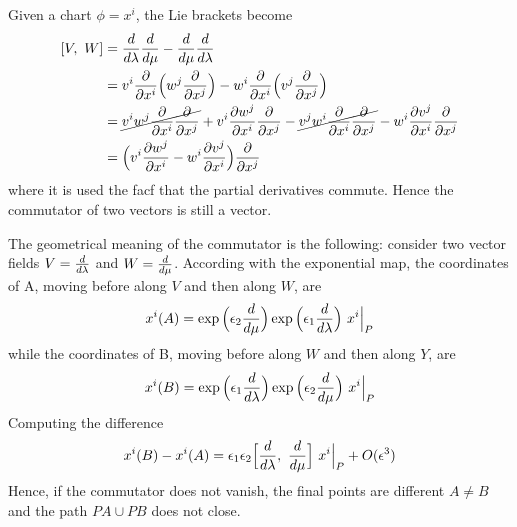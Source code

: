     Given a chart $\phi = x^i$, the Lie brackets become
    \begin{equation*}
    \begin{aligned}
        [V, ~W] & = \dv{}{\lambda} \dv{}{\mu} - \dv{}{\mu} \dv{}{\lambda} \\ & = v^i \pdv{}{x^i} \Big( w^j \pdv{}{x^j} \Big) - w^i \pdv{}{x^i} \Big( v^j \pdv{}{x^j} \Big) \\ & = \cancel{v^i w^j \pdv{}{x^i} \pdv{}{x^j}} + v^i \pdv{w^j}{x^i} \pdv{}{x^j} - \cancel{v^j w^i \pdv{}{x^i} \pdv{}{x^j}} - w^i \pdv{v^j}{x^i} \pdv{}{x^j} \\ & = \Big ( v^i \pdv{w^j}{x^i} - w^i \pdv{v^j}{x^i} \Big ) \pdv{}{x^j} 
    \end{aligned}
    \end{equation*}
    where it is used the facf that the partial derivatives commute. Hence the commutator of two vectors is still a vector. 

    The geometrical meaning of the commutator is the following: consider two vector fields $V = \frac{d}{d\lambda}$ and $W = \frac{d}{d\mu}$. According with the exponential map, the coordinates of A, moving before along $V$ and then along $W$, are 
    \begin{equation*}
        x^i(A) = \exp \Big ( \epsilon_2 \frac{d}{d\mu} \Big) \exp \Big ( \epsilon_1 \frac{d}{d\lambda} \Big) ~ x^i \Big\vert_P
    \end{equation*}
    while the coordinates of B, moving before along $W$ and then along $Y$, are 
    \begin{equation*}
        x^i(B) = \exp \Big ( \epsilon_1 \frac{d}{d\lambda} \Big) \exp \Big ( \epsilon_2 \frac{d}{d\mu} \Big) ~ x^i \Big\vert_P
    \end{equation*}
    Computing the difference
    \begin{equation*}
        x^i(B) - x^i(A) = \epsilon_1 \epsilon_2 \Big [\frac{d}{d\lambda}, ~\frac{d}{d\mu} \Big ] ~ x^i \Big\vert_P + O(\epsilon^3)
    \end{equation*}
    Hence, if the commutator does not vanish, the final points are different $A \neq B$ and the path $PA \cup PB$ does not close. 

